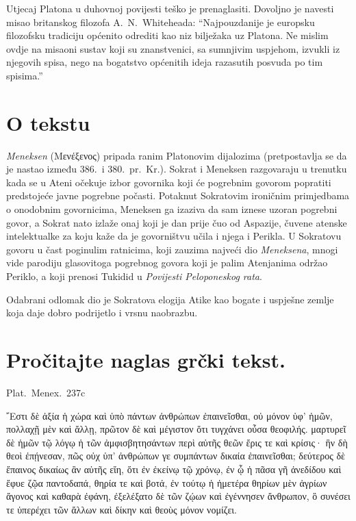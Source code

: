 Utjecaj Platona u duhovnoj povijesti teško je prenaglasiti. Dovoljno je navesti misao britanskog filozofa A.~N.\ Whiteheada: “Najpouzdanije je europsku filozofsku tradiciju općenito odrediti kao niz bilježaka uz Platona. Ne mislim ovdje na misaoni sustav koji su znanstvenici, sa sumnjivim uspjehom, izvukli iz njegovih spisa, nego na bogatstvo općenitih ideja razasutih posvuda po tim spisima.”

\section*{O tekstu}

\textit{Meneksen} \textgreek[variant=ancient]{(Μενέξενος)} pripada ranim Platonovim dijalozima (pretpostavlja se da je nastao između 386.\ i 380.\ pr.~Kr.). Sokrat i Meneksen razgovaraju u trenutku kada se u Ateni očekuje izbor govornika koji će pogrebnim govorom popratiti predstojeće javne pogrebne počasti. Potaknut Sokratovim ironičnim primjedbama o onodobnim govornicima, Meneksen ga izaziva da sam iznese uzoran pogrebni govor, a Sokrat nato izlaže onaj koji je dan prije čuo od Aspazije, čuvene atenske intelektualke za koju kaže da je govorništvu učila i njega i Perikla. U Sokratovu govoru u čast poginulim ratnicima, koji zauzima najveći dio \textit{Meneksena}, mnogi vide parodiju glasovitoga pogrebnog govora koji je palim Atenjanima održao Periklo, a koji prenosi Tukidid u \textit{Povijesti Peloponeskog rata}. 

Odabrani odlomak dio je Sokratova elogija Atike kao bogate i uspješne zemlje koja daje dobro podrijetlo i vrsnu naobrazbu.


\section*{Pročitajte naglas grčki tekst.}

Plat.\ Menex.\ 237c

\medskip

{\large
\begin{greek}
῎Εστι δὲ ἀξία ἡ χώρα καὶ ὑπὸ πάντων ἀνθρώπων ἐπαινεῖσθαι, οὐ μόνον ὑφ' ἡμῶν, πολλαχῇ μὲν καὶ ἄλλῃ, πρῶτον δὲ καὶ μέγιστον ὅτι τυγχάνει οὖσα θεοφιλής. μαρτυρεῖ δὲ ἡμῶν τῷ λόγῳ ἡ τῶν ἀμφισβητησάντων περὶ αὐτῆς θεῶν ἔρις τε καὶ κρίσις· ἣν δὴ θεοὶ ἐπῄνεσαν, πῶς οὐχ ὑπ' ἀνθρώπων γε συμπάντων δικαία ἐπαινεῖσθαι; δεύτερος δὲ ἔπαινος δικαίως ἂν αὐτῆς εἴη, ὅτι ἐν ἐκείνῳ τῷ χρόνῳ, ἐν ᾧ ἡ πᾶσα γῆ ἀνεδίδου καὶ ἔφυε ζῷα παντοδαπά, θηρία τε καὶ βοτά, ἐν τούτῳ ἡ ἡμετέρα θηρίων μὲν ἀγρίων ἄγονος καὶ καθαρὰ ἐφάνη, ἐξελέξατο δὲ τῶν ζῴων καὶ ἐγέννησεν ἄνθρωπον, ὃ συνέσει τε ὑπερέχει τῶν ἄλλων καὶ δίκην καὶ θεοὺς μόνον νομίζει.
\end{greek}

}

